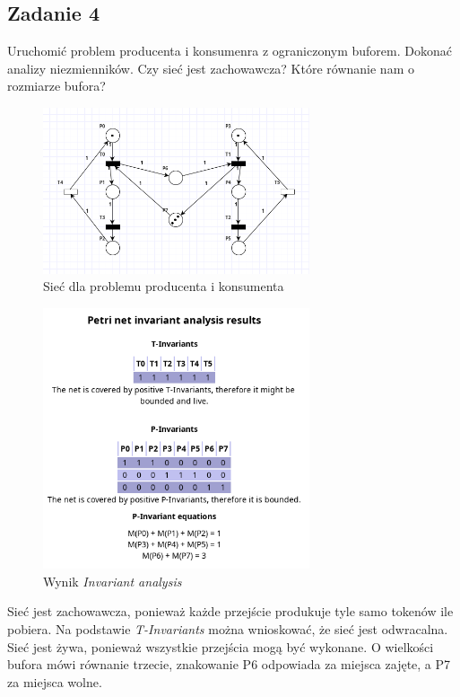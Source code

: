 \documentclass{article}
\begin{document}
\subsection{Zadanie 4}
Uruchomić problem producenta i konsumenra z ograniczonym buforem. Dokonać analizy niezmienników.
Czy sieć jest zachowawcza? Które równanie nam o rozmiarze bufora?

\begin{figure}[H]
    \centering
    \includegraphics[width=0.7\textwidth]{net_4.png}
    \caption{Sieć dla problemu producenta i konsumenta}
\end{figure}

\begin{figure}[H]
    \centering
    \includegraphics[width=0.7\textwidth]{invariant_4.png}
    \caption{Wynik \textit{Invariant analysis}}
\end{figure}

Sieć jest zachowawcza, ponieważ każde przejście produkuje tyle samo tokenów ile pobiera.
Na podstawie \textit{T-Invariants} można wnioskować, że sieć jest odwracalna. Sieć jest
żywa, ponieważ wszystkie przejścia mogą być wykonane. O wielkości bufora mówi równanie
trzecie, znakowanie P6 odpowiada za miejsca zajęte, a P7 za miejsca wolne.
\end{document}
